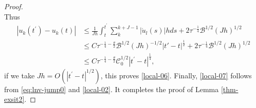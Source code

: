\documentclass[10pt,a4paper]{amsart}
\begin{document}
\begin{proof}
\[\]
Thus
\[\begin{aligned}
\displaystyle 
\left| {{u}_{k}\left( {t}^{\prime }\right)  - {u}_{k}(t) }\right| & \leq  \frac{1}{Jh}\int_{t}^{{t}^{\prime }}\mathop{\sum }\limits_{k}^{{k + J - 1}}\left| {{\dot{u}}_{l}\left( s\right) }\right| {hds} + 2\tau^{-\frac14}\mathscr{B}^{1/2}(Jh)^{1/2}\\
&\leq C\tau^{-\frac14-\frac{\theta}{2}}\mathscr{B}^{1/2}(Jh)^{-1/2}|t'-t|^{\frac12}+2\tau^{-\frac14}\mathscr{B}^{1/2}(Jh)^{1/2}\\
& \leq  C\tau^{-\frac14-\frac{\theta}{2}}\mathscr{C}_0^{1/2}{\left| {t}^{\prime } - t\right| }^{\frac14},
\end{aligned}\]
if we take \({Jh} = O( {| {t}^{\prime } - t| }^{1/2})\), this proves \eqref{local-06}. Finally, \eqref{local-07} follows from \eqref{eq:lnv-jump0} and \eqref{local-02}. It completes the proof of Lemma \ref{thm-exsit2}.
\end{proof}
\end{document}
